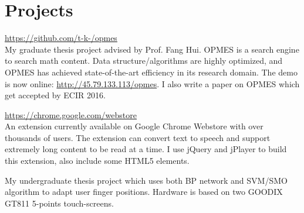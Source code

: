 \documentclass[]{deedy-resume-openfont}
\begin{document}
\begin{minipage}[t]{0.66\textwidth}
\section{Projects}

\href{https://github.com/t-k-/opmes}{https://github.com/t-k-/opmes} \\
\vspace{\topsep} %
My graduate thesis project advised by Prof. Fang Hui. OPMES is a search engine to search math content.
Data structure/algorithms are highly optimized, and OPMES has achieved state-of-the-art efficiency in its research domain.
The demo is now online: \url{http://45.79.133.113/opmes}. 
I also write a paper on OPMES which get accepted by ECIR 2016.
\sectionsep

\href{https://chrome.google.com/webstore/detail/voice-instead/kphdioekpiaekpmlkhpaicehepbkccbf}{https://chrome.google.com/webstore}\\
\vspace{\topsep} %
An extension currently available on {Google Chrome Webstore} with over thousands of users. The extension can convert text to speech and support extremely long content to be read at a time. I use jQuery and jPlayer to build this extension, also include some HTML5 elements.
\sectionsep


\vspace{\topsep} %
My undergraduate thesis project which uses both BP network and SVM/SMO algorithm to adapt user finger positions. Hardware is based on two GOODIX GT811 5-points touch-screens.
\sectionsep


\end{minipage}
\end{document}
